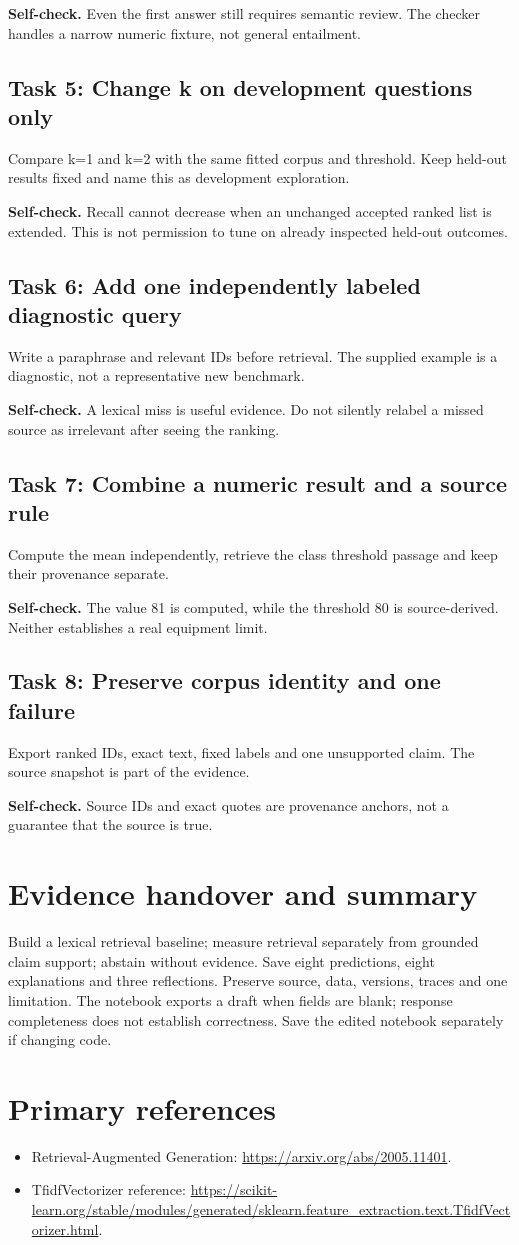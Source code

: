 \textbf{Self-check.} Even the first answer still requires semantic review. The checker handles a narrow numeric fixture, not general entailment.
\subsection{Task 5: Change k on development questions only}
Compare k=1 and k=2 with the same fitted corpus and threshold. Keep held-out results fixed and name this as development exploration.

\textbf{Self-check.} Recall cannot decrease when an unchanged accepted ranked list is extended. This is not permission to tune on already inspected held-out outcomes.
\subsection{Task 6: Add one independently labeled diagnostic query}
Write a paraphrase and relevant IDs before retrieval. The supplied example is a diagnostic, not a representative new benchmark.

\textbf{Self-check.} A lexical miss is useful evidence. Do not silently relabel a missed source as irrelevant after seeing the ranking.
\subsection{Task 7: Combine a numeric result and a source rule}
Compute the mean independently, retrieve the class threshold passage and keep their provenance separate.

\textbf{Self-check.} The value 81 is computed, while the threshold 80 is source-derived. Neither establishes a real equipment limit.
\subsection{Task 8: Preserve corpus identity and one failure}
Export ranked IDs, exact text, fixed labels and one unsupported claim. The source snapshot is part of the evidence.

\textbf{Self-check.} Source IDs and exact quotes are provenance anchors, not a guarantee that the source is true.
\section{Evidence handover and summary}
Build a lexical retrieval baseline; measure retrieval separately from grounded claim support; abstain without evidence. Save eight predictions, eight explanations and three reflections. Preserve source, data, versions, traces and one limitation. The notebook exports a draft when fields are blank; response completeness does not establish correctness. Save the edited notebook separately if changing code.
\section{Primary references}
\begin{itemize}
\item Retrieval-Augmented Generation: \url{https://arxiv.org/abs/2005.11401}.
\item TfidfVectorizer reference: \url{https://scikit-learn.org/stable/modules/generated/sklearn.feature_extraction.text.TfidfVectorizer.html}.
\end{itemize}
